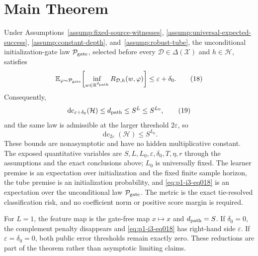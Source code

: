 \section{Main Theorem}
\label{sec:main-theorem}

\begin{theorem}
\label{thm:main}
Under Assumptions~\ref{assump:fixed-source-witnesses},
\ref{assump:universal-expected-success},
\ref{assump:constant-depth}, and~\ref{assump:robust-tube}, the unconditional
initialization-gate law $\mathcal P_{\rm gate}$, selected before every
$\mathcal D\in\Delta(\mathcal X)$ and $h\in\mathcal H$, satisfies
\[
\mathbb E_{\varphi\sim\mathcal P_{\rm gate}}\!\left[
\inf_{w\in\mathbb R^{d_{\rm path}}}
R_{\mathcal D,h}(w,\varphi)
\right]\leq\varepsilon+\delta_0.
\tag{18}\label{eq:p1-i3-eq018}
\]
Consequently,
\[
\operatorname{dc}_{\varepsilon+\delta_0}(\mathcal H)
\leq d_{\rm path}
\leq S^L
\leq S^{L_0},
\tag{19}\label{eq:p1-i3-eq019}
\]
and the same law is admissible at the larger threshold $2\varepsilon$, so
\[
\operatorname{dc}_{2\varepsilon}(\mathcal H)\leq S^{L_0}.
\tag{20}\label{eq:p1-i3-eq020}
\]
These bounds are nonasymptotic and have no hidden multiplicative constant.
The exposed quantitative variables are
$S,L,L_0,\varepsilon,\delta_0,T,\eta,r$ through the assumptions and the exact
conclusions above; $L_0$ is universally fixed.  The learner premise is an
expectation over initialization and the fixed finite sample horizon, the tube
premise is an initialization probability, and \eqref{eq:p1-i3-eq018} is an expectation over the
unconditional law $\mathcal P_{\rm gate}$.  The metric is the exact
tie-resolved classification risk, and no coefficient norm or positive score
margin is required.
\end{theorem}

For $L=1$, the feature map is the gate-free map $x\mapsto x$ and
$d_{\rm path}=S$.  If $\delta_0=0$, the complement penalty disappears and
\eqref{eq:p1-i3-eq018} has right-hand side $\varepsilon$.  If
$\varepsilon=\delta_0=0$, both public error thresholds remain exactly zero.
These reductions are part of the theorem rather than asymptotic limiting
claims.
